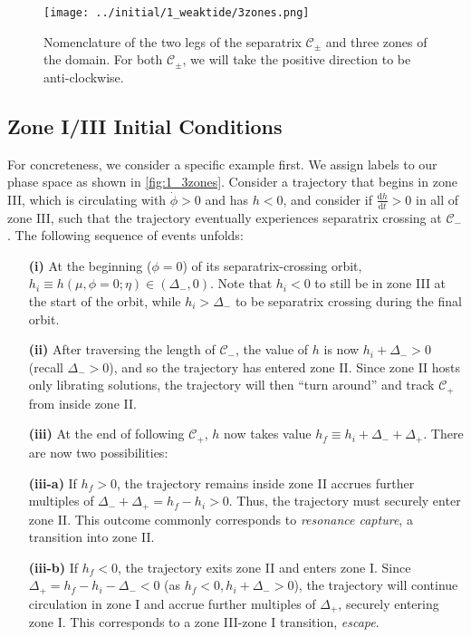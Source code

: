 \documentclass[
        fleqn,
        usenatbib,
    ]{mnras}
\newcommand*{\rd}[2]{\frac{\mathrm{d}#1}{\mathrm{d}#2}}
\begin{document}
\begin{figure}
    \centering
    \texttt{[image: ../initial/1\_weaktide/3zones.png]}
    \caption{Nomenclature of the two legs of the separatrix $\mathcal{C}_{\pm}$
    and three zones of the domain. For both $\mathcal{C}_{\pm}$, we will take
    the positive direction to be anti-clockwise.}\label{fig:1_3zones}
\end{figure}

\subsection{Zone I/III Initial Conditions}\label{ss:z_out_ic}

For concreteness, we consider a specific example first. We assign labels to our
phase space as shown in \autoref{fig:1_3zones}. Consider a trajectory that
begins in zone III, which is circulating with $\dot{\phi} > 0$ and has $h < 0$,
and consider if $\rd{h}{t} > 0$ in all of zone III, such that the trajectory
eventually experiences separatrix crossing at $\mathcal{C}_-$. The following
sequence of events unfolds:
\begin{enumerate}
    \item[\textbf{(i)}] At the beginning ($\phi = 0$) of its separatrix-crossing
        orbit, $h_i \equiv h(\mu, \phi = 0; \eta) \in (\Delta_-, 0)$. Note
        that $h_i < 0$ to still be in zone III at the start of the orbit, while
        $h_i > \Delta_-$ to be separatrix crossing during the final orbit.

    \item[\textbf{(ii)}] After traversing the length of $\mathcal{C}_-$, the
        value of $h$ is now $h_i + \Delta_- > 0$ (recall $\Delta_- > 0$), and so
        the trajectory has entered zone II\@. Since zone II hosts only librating
        solutions, the trajectory will then ``turn around'' and track
        $\mathcal{C}_+$ from inside zone II\@.

    \item[\textbf{(iii)}] At the end of following $\mathcal{C}_+$, $h$ now takes
        value $h_f \equiv h_i + \Delta_- + \Delta_+$. There are now two
        possibilities:

    \item[\textbf{(iii-a)}] If $h_f > 0$, the trajectory remains inside zone II
        accrues further multiples of $\Delta_- + \Delta_+ = h_f - h_i > 0$.
        Thus, the trajectory must securely enter zone II\@. This outcome
        commonly corresponds to \emph{resonance capture}, a transition into zone
        II\@.

    \item[\textbf{(iii-b)}] If $h_f < 0$, the trajectory exits zone II and
        enters zone I\@. Since $\Delta_+ = h_f - h_i - \Delta_- < 0$ (as $h_f
        < 0, h_i + \Delta_- > 0$), the trajectory will continue circulation in
        zone I and accrue further multiples of $\Delta_+$, securely entering
        zone I\@. This corresponds to a zone III-zone I transition,
        \emph{escape}.
\end{enumerate}
\end{document}
